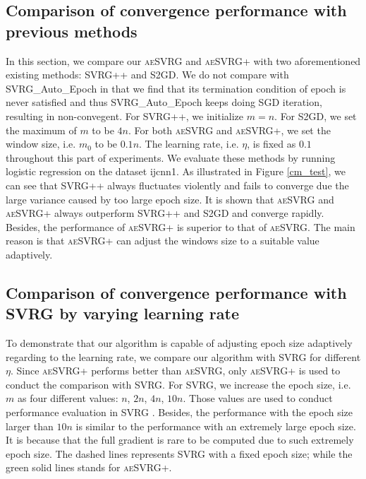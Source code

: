 \documentclass[conference]{IEEEtran}
\begin{document}
\subsection{Comparison of convergence performance with previous methods}
In this section, we compare our \textsc{aeSVRG} and \textsc{aeSVRG+} with two aforementioned existing methods: SVRG++ and S2GD. We do not compare with SVRG\_Auto\_Epoch in that we find that its termination condition of epoch is never satisfied and  thus SVRG\_Auto\_Epoch keeps doing SGD iteration, resulting in non-convegent. For SVRG++, we initialize $m = n$. For S2GD, we set the maximum of $m$ to be $4n$. For both \textsc{aeSVRG} and \textsc{aeSVRG+}, we set the window size, i.e. $m_0$ to be $0.1n$. The learning rate, i.e. $\eta$, is fixed as $0.1$ throughout this part of experiments. We evaluate these methods by running logistic regression on the dataset ijcnn1. 
As illustrated in Figure \ref{cm_test}, we can see that SVRG++ always fluctuates violently and fails to converge due the large variance caused by too large epoch size. It is shown that \textsc{aeSVRG} and \textsc{aeSVRG+} always outperform SVRG++ and S2GD and converge rapidly. Besides, the performance of \textsc{aeSVRG+} is superior to that of \textsc{aeSVRG}. The main reason is that \textsc{aeSVRG+} can adjust the windows size to a suitable value adaptively.


 \subsection{Comparison of convergence performance with SVRG by varying learning rate}
 To demonstrate that our algorithm is capable of adjusting epoch size adaptively regarding to the learning rate, we compare our algorithm with SVRG for different $\eta$.
Since \textsc{aeSVRG+} performs better than \textsc{aeSVRG}, only \textsc{aeSVRG+} is used to conduct the comparison with SVRG. For SVRG, we increase the epoch size, i.e. $m$ as four different values: $n$, $2n$, $4n$, $10n$. Those values are used to conduct performance evaluation in SVRG \citep{Johnson:9MAvkbgy}.  Besides, the performance with the epoch size larger than $10n$ is similar  to the performance with an extremely large epoch size. It is because that the full gradient is rare to be computed due to such extremely epoch size. The dashed lines represents SVRG with a fixed epoch size; while the green solid lines stands for \textsc{aeSVRG+}.
\end{document}
